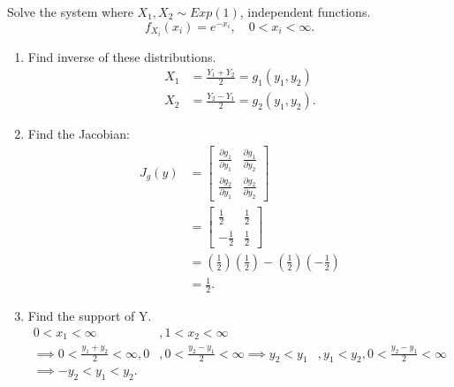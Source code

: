 \begin{example}
	Solve the system where $X_1, X_2 \sim Exp\left( 1 \right)  $, independent functions. 
	\[
		f_{X_i}\left( x_{i} \right) = e^{-x_{i}}, \quad 0 < x_{i} < \infty
	.\]
	
	\begin{enumerate}
		\item Find inverse of these distributions. 
			\begin{align*}
X_1 &= \frac{Y_1 + Y_2}{2} = g_1\left( y_1, y_2 \right)  \\
	X_2 &= \frac{Y_2 - Y_1}{2} = g_2\left( y_1, y_2 \right) 
			.\end{align*}
		\item Find the Jacobian:
			\begin{align*}
				J_{g}\left( y \right) &= \begin{bmatrix} 
				\frac{\partial g_1}{\partial y_1} & \frac{\partial g_1}{\partial y_2} \\
			\frac{\partial g_2}{\partial y_1} & \frac{\partial g_2}{\partial y_2} \end{bmatrix}  \\
							  &= \begin{bmatrix} \frac{1}{2} & \frac{1}{2} \\
							  -\frac{1}{2} & \frac{1}{2}\end{bmatrix}  \\
								       &= \left( \frac{1}{2} \right) \left( \frac{1}{2} \right)  - \left( \frac{1}{2} \right) \left( -\frac{1}{2} \right)  \\
								       &= \frac{1}{2}
			.\end{align*}
		\item Find the support of Y. 
			\begin{align*}
				0 < x_1 < \infty &, 1 < x_2 < \infty \\
				\implies 0 < \frac{y_1 + y_2}{2} < \infty, 0 &, 0 <  \frac{y_2 - y_1}{2} < \infty 
				\implies y_2 < y_1 & , y_1 < y_2 , 0 < \frac{y_2 - y_1}{2} < \infty\\
				\implies -y_2 < y_1 < y_2
			.\end{align*}

	\end{enumerate}
\end{example}

